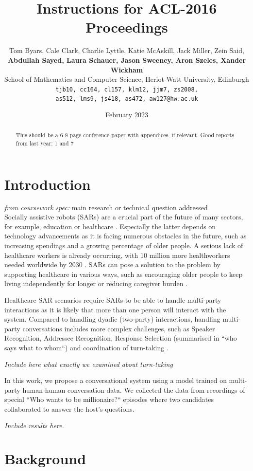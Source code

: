 \documentclass[hidelinks, 11pt]{article}
\title{Instructions for ACL-2016 Proceedings}
\author{Tom Byars, Cale Clark, Charlie Lyttle, Katie McAskill, Jack Miller, Zein Said, \\
{\bf Abdullah Sayed, Laura Schauer, Jason Sweeney, Aron Szeles, Xander Wickham} \\
School of Mathematics and Computer Science, Heriot-Watt University, Edinburgh \\ {\tt {tjb10, cc164, cl157, klm12, jjm7, zs2008,}} \\ {\tt {as512, lms9, js418, as472, aw127}@hw.ac.uk}}
\date{February 2023}
\begin{document}
\maketitle
\begin{abstract}
  This should be a 6-8 page conference paper with appendices, if relevant.
  Good reports from last year: 1 and 7
\end{abstract}


\section{Introduction}
\label{sec:introduction}

\textit{from coursework spec:} main research or technical question addressed \\
Socially assistive robots (SARs) are a crucial part of the future of many sectors, for example, education or healthcare \cite{gunson_visually_aware_2022}. Especially the latter depends on technology advancements as it is facing numerous obstacles in the future, such as increasing spendings and a growing percentage of older people. A serious lack of healthcare workers is already occurring, with 10 million more healthworkers needed worldwide by 2030 \cite{cooper_ari_2020,Health_workforce_2023}. SARs can pose a solution to the problem by supporting healthcare in various ways, such as encouraging older people to keep living independently for longer or reducing caregiver burden \cite{cooper_ari_2020}.

Healthcare SAR scenarios require SARs to be able to handle multi-party interactions as it is likely that more than one person will interact with the system. Compared to handling dyadic (two-party) interactions, handling multi-party conversations includes more complex challenges, such as Speaker Recognition, Addressee Recognition, Response Selection (summarised in “who says what to whom“) and coordination of turn-taking \cite{Group_1_unpublished_paper,Johansson_Skantze_2015}.

\textit{Include here what exactly we examined about turn-taking}

In this work, we propose a conversational system using a model trained on multi-party human-human conversation data. We collected the data from recordings of special “Who wants to be millionaire?“ episodes where two candidates collaborated to answer the host's questions.

\textit{Include results here.}


\section{Background}
\label{sec:background}
\end{document}
